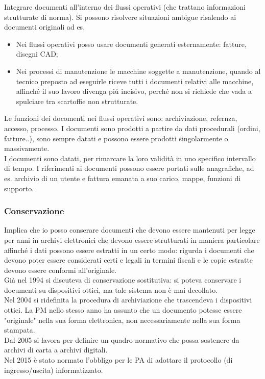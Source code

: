 Integrare documenti all'interno dei flussi operativi (che trattano
informazioni strutturate di norma). Si possono risolvere situazioni
ambigue risalendo ai documenti originali ad es. 

\begin{itemize}
  \item 
    Nei flussi operativi posso usare documenti generati esternamente: fatture, 
    disegni CAD; 
  \item 
    Nei processi di manutenzione le macchine soggette a manutenzione,
    quando al tecnico preposto ad eseguirle riceve tutti i documenti
    relativi alle macchine, affinch\'e il suo lavoro divenga pi\'u incisivo,
    perch\'e non si richiede che vada a spulciare tra scartoffie non
    strutturate.
\end{itemize}

Le funzioni dei docomenti nei flussi operativi sono: archiviazione,
refernza, accesso, processo. I documenti sono prodotti a partire da dati
procedurali (ordini, fatture..), sono sempre datati e possono essere
prodotti singolarmente o massivamente.\\
I documenti sono datati, per rimarcare la loro validit\`a in uno specifico
intervallo di tempo. I riferimenti ai documenti possono essere portati
sulle anagrafiche, ad es. archivio di un utente e fattura emanata a suo
carico, mappe, funzioni di supporto.

\subsubsection{Conservazione}

Implica che io posso conserare documenti che devono essere mantenuti per
legge per anni in archivi elettronici che devono essere strutturati in
maniera particolare affinch\'e i dati possono essere estratti in un certo
modo: rigurda i documenti che devono poter essere considerati certi e legali in
termini fiscali e le copie estratte devono essere conformi all'originale.\\

Gi\`a nel 1994 si discuteva di conservazione sostitutiva: si poteva
conservare i documenti su dispositivi ottici, ma tale sistema non \`e mai
decollato.\\
Nel 2004 si ridefinita la procedura di archiviazione che trascendeva i
dispositivi ottici. La PM nello stesso anno ha assunto che un documento
potesse essere "originale" nella sua forma elettronica, non
necessariamente nella sua forma stampata.\\
Dal 2005 si lavora per definire un quadro normativo che possa sostenere
da archivi di carta a archivi digitali.\\
Nel 2015 \`e stato normato l'obbligo per le PA di adottare il protocollo
(di ingresso/uscita) informatizzato.

